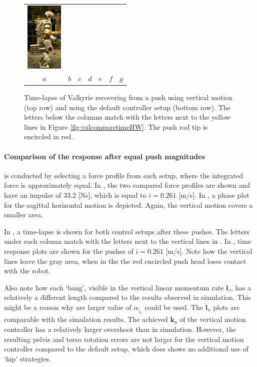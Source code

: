 \begin{figure}
\begin{tabular}{ccccccc}
    \includegraphics[width=0.7in]{STYLESTUFF/val7d_30} \\
    $a$&
    $b$&
    $c$&
    $d$&
    $e$&
    $f$&
    $g$\\
  \end{tabular}
  \caption{Time-lapse of Valkyrie recovering from a push using vertical motion (top row) and using the default controller setup (bottom row). The letters below the columns match with the letters next to the yellow lines in Figure \ref{fig:valcomparetimeHW}. The push rod tip is encircled in red.}
  \label{fig:val}
\end{figure}

\paragraph{Comparison of the response after equal push magnitudes} is conducted by selecting a force profile from each setup, where the integrated force is approximately equal. In , the two compared force profiles are shown and have an impulse of $33.2$ [Ns], which is equal to $i=0.261$ [m/s]. In , a phase plot for the sagittal horizontal motion is depicted. Again, the vertical motion covers a smaller area. 

In , a time-lapse is shown for both control setups after these pushes. The letters under each column match with the letters next to the vertical lines in . In , time response plots are shown for the pushes of $i=0.261$ [m/s]. Note how the vertical lines leave the gray area, when in the  the red encircled push head loses contact with the robot. 

Also note how each `bang', visible in the vertical linear momentum rate $\dot{\mathbf{l}}_z$, has a relatively a different length compared to the results observed in simulation. This might be a reason why are larger value of $\alpha_{\hat{\ddot{z}}_{c}}$ could be used. The $\dot{\mathbf{l}}_x$ plots are comparable with the simulation results. The achieved $\dot{\mathbf{k}}_y$ of the vertical motion controller has a relatively larger overshoot than in simulation. However, the resulting pelvis and torso rotation errors are not larger for the vertical motion controller compared to the default setup, which does shows no additional use of `hip' strategies. 

